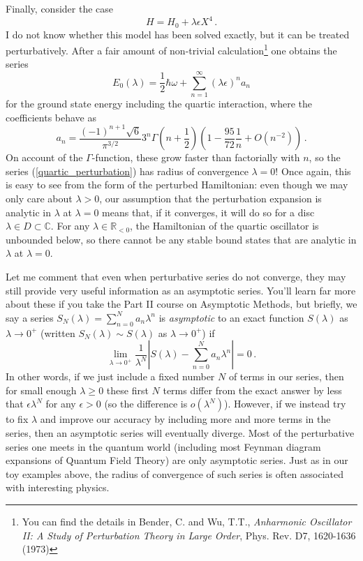 \documentclass{article}
\theoremstyle{plain}\theoremheaderfont{\normalfont\itshape}\theorembodyfont{\rmfamily}\theoremseparator{.}\newtheorem*{rem}{Remark}\newtheorem*{ex}{Example}\newtheorem*{proof}{Proof}\newtheorem*{altp}{Alternative proof}
\theoremstyle{plain}\theoremheaderfont{\normalfont\bfseries}\theorembodyfont{\rmfamily}\theoremseparator{.}\newtheorem{thm}{Theorem}[section]\newtheorem{lem}[thm]{Lemma}\newtheorem{prop}[thm]{Proposition}\newtheorem*{cor}{Corollary}\newtheorem{defn}[thm]{Definition}\newtheorem{clm}[thm]{Claim}\newtheorem{clminproof}{Claim}
\theoremstyle{break}\theoremheaderfont{\normalfont\itshape}\theorembodyfont{\rmfamily}\theoremseparator{.\medskip}\newtheorem*{proofskip}{Proof}\newtheorem*{exs}{Examples}\newtheorem*{rems}{Remarks}
\theoremstyle{break}\theoremheaderfont{\normalfont\bfseries}\theorembodyfont{\rmfamily}\theoremseparator{.\medskip}\newtheorem{lemskip}[thm]{Lemma}\newtheorem{defnskip}[thm]{Definition}\newtheorem{propskip}[thm]{Proposition}\newtheorem{thmskip}[thm]{Theorem}
\numberwithin{equation}{section}
\newcommand{\abs}[1]{\left| #1 \right|}
\newcommand{\RR}{\mathbb{R}}
\newcommand{\CC}{\mathbb{C}}
\begin{document}
    Finally, consider the case
    \begin{equation}
        H=H_0+\lambda\epsilon X^4\,.
    \end{equation}
    I do not know whether this model has been solved exactly, but it can be treated perturbatively. After a fair amount of non-trivial calculation\footnote{You can find the details in Bender, C. and Wu, T.T., \textit{Anharmonic Oscillator II: A Study of Perturbation Theory in Large Order}, Phys. Rev. D7, 1620-1636 (1973)} one obtains the series
    \begin{equation}\label{quartic_perturbation}
        E_0(\lambda)=\frac{1}{2}\hbar\omega+\sum_{n=1}^{\infty}(\lambda\epsilon)^n a_n
    \end{equation}
    for the ground state energy including the quartic interaction, where the coefficients behave as
    \begin{equation}
        a_n=\frac{(-1)^{n+1}\sqrt{6}}{\pi^{3/2}}3^n\Gamma\left(n+\frac{1}{2}\right)\left(1-\frac{95}{72}\frac{1}{n}+O(n^{-2})\right)\,.
    \end{equation}
    On account of the \(\Gamma\)-function, these grow faster than factorially with \(n\), so the series (\ref{quartic_perturbation}) has radius of convergence \(\lambda=0\)! Once again, this is easy to see from the form of the perturbed Hamiltonian: even though we may only care about \(\lambda>0\), our assumption that the perturbation expansion is analytic in \(\lambda\) at \(\lambda=0\) means that, if it converges, it will do so for a disc \(\lambda\in D\subset\CC\). For any \(\lambda\in\RR_{<0}\), the Hamiltonian of the quartic oscillator is unbounded below, so there cannot be any stable bound states that are analytic in \(\lambda\) at \(\lambda=0\).

    Let me comment that even when perturbative series do not converge, they may still provide very useful information as an asymptotic series. You'll learn far more about these if you take the Part II course on Asymptotic Methods, but briefly, we say a series \(S_N(\lambda)=\sum_{n=0}^{N}a_n\lambda^n\) is \textit{asymptotic} to an exact function \(S(\lambda)\) as \(\lambda\to 0^+\) (written \(S_N(\lambda)\sim S(\lambda)\) as \(\lambda\to 0^+\)) if
    \begin{equation}
        \lim_{\lambda\to 0^+}\frac{1}{\lambda^N}\abs{S(\lambda)-\sum_{n=0}^{N}a_n\lambda^n}=0\,.
    \end{equation}
    In other words, if we just include a fixed number \(N\) of terms in our series, then for small enough \(\lambda\ge 0\) these first \(N\) terms differ from the exact answer by less that \(\epsilon\lambda^N\) for any \(\epsilon>0\) (so the difference is \(o(\lambda^N)\)). However, if we instead try to fix \(\lambda\) and improve our accuracy by including more and more terms in the series, then an asymptotic series will eventually diverge. Most of the perturbative series one meets in the quantum world (including most Feynman diagram expansions of Quantum Field Theory) are only asymptotic series. Just as in our toy examples above, the radius of convergence of such series is often associated with interesting physics.
\end{document}
